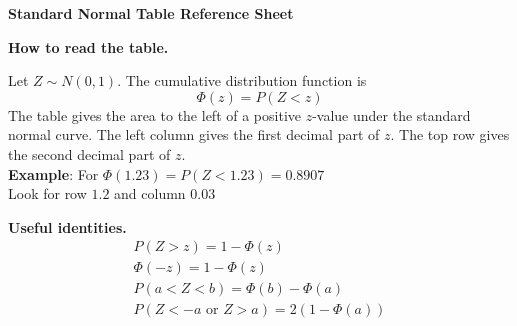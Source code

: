 \documentclass[11pt]{article}
\begin{document}
	
	\begin{center}
		{\Large\textbf{Standard Normal Table Reference Sheet}}
	\end{center}
	
	\vspace{0.1cm}
	
	\noindent
	\begin{minipage}[t]{0.68\textwidth}
		\vspace{0pt}
		
		\textbf{How to read the table.}
		
		Let \(Z\sim N(0,1)\). The cumulative distribution function is
		\[
		\Phi(z)=P(Z<z)
		\]
		The table gives the area to the left of a positive \(z\)-value under the standard normal curve. The left column gives the first decimal part of \(z\). The top row gives the second decimal part of \(z\). \\
		
		\textbf{Example}: For \(\Phi(1.23) =P(Z<1.23) = 0.8907 \) \\  \hspace*{5cm} Look for row \(1.2\) and column \(0.03\)
	\end{minipage}%
	\hfill
	\begin{minipage}[t]{0.28\textwidth}
		\vspace{0pt}
		
		\textbf{Useful identities.}
		\begin{gather*}
			P(Z>z)=1-\Phi(z)\\
			\Phi(-z)=1-\Phi(z)\\
			P(a<Z<b)=\Phi(b)-\Phi(a)\\
			P(Z<-a\text{ or }Z>a)=2(1-\Phi(a))
		\end{gather*}
	\end{minipage}
	
\end{document}
